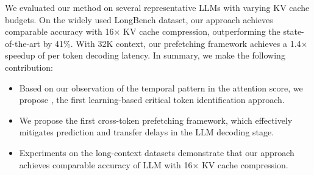 We evaluated our method on several representative LLMs with varying KV cache budgets. On the widely used LongBench dataset, our approach achieves 
comparable accuracy
with 16× KV cache compression, outperforming the state-of-the-art by 41\%.  With 32K context, our prefetching framework achieves a 1.4$\times$ speedup of per token decoding latency.
In summary, we make the following contribution:
\begin{itemize}
\item 
Based on our observation of the temporal pattern in the attention score, we propose \ours, the first learning-based critical token identification approach.
\item We propose the first cross-token prefetching framework, which effectively mitigates prediction and transfer delays in the LLM decoding stage. 
\item Experiments on the long-context datasets demonstrate that our approach achieves comparable accuracy of LLM with 16× KV cache compression.

\end{itemize}

